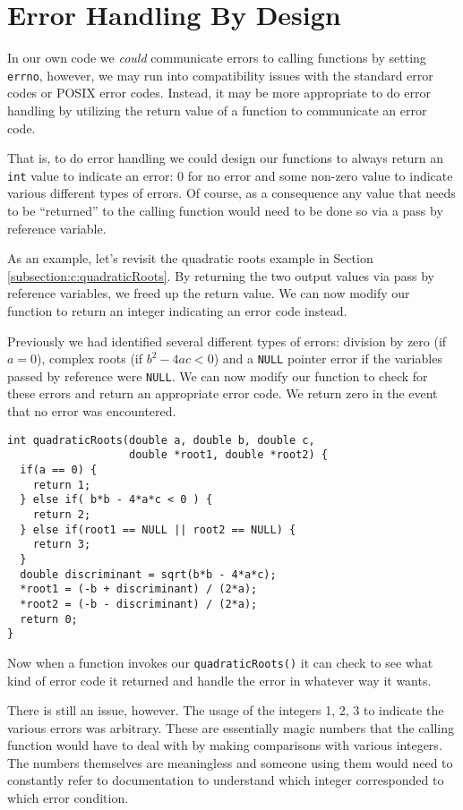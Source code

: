 \section{Error Handling By Design}

In our own code we \emph{could} communicate errors to calling
functions by setting \texttt{errno}, however, we may run 
into compatibility issues with the standard error codes or POSIX 
error codes.  Instead, it may be more appropriate to do error 
handling by utilizing the return value of a function to communicate
an error code.  

That is, to do error handling we could design our functions to always
return an \texttt{int} value to indicate an error: 0 for no error
and some non-zero value to indicate various different types of errors.
Of course, as a consequence any value that needs to be ``returned''
to the calling function would need to be done so via a pass by reference
variable.  

As an example, let's revisit the quadratic roots example in Section
\ref{subsection:c:quadraticRoots}.  By returning the two output values
via pass by reference variables, we freed up the return value.  We
can now modify our function to return an integer indicating an
error code instead.

Previously we had identified several different types of errors: division
by zero (if $a = 0$), complex roots (if $b^2 - 4ac < 0$) and a 
\texttt{NULL} pointer error if the variables passed by reference
were \texttt{NULL}.  We can now modify our function to 
check for these errors and return an appropriate error code.
We return zero in the event that no error was encountered.

\begin{verbatim}
int quadraticRoots(double a, double b, double c, 
                   double *root1, double *root2) {
  if(a == 0) {
    return 1;
  } else if( b*b - 4*a*c < 0 ) {
    return 2;
  } else if(root1 == NULL || root2 == NULL) {
    return 3;
  }
  double discriminant = sqrt(b*b - 4*a*c);
  *root1 = (-b + discriminant) / (2*a);
  *root2 = (-b - discriminant) / (2*a);
  return 0;
}
\end{verbatim}

Now when a function invokes our \texttt{quadraticRoots()}
it can check to see what kind of error code it returned and
handle the error in whatever way it wants.  

There is still an issue, however.  The usage of the integers 1, 2, 3
to indicate the various errors was arbitrary.  These are essentially
\glspl{magic number} that the calling function would have to deal
with by making comparisons with various integers.  The numbers
themselves are meaningless and someone using them would 
need to constantly refer to documentation to understand which
integer corresponded to which error condition.

